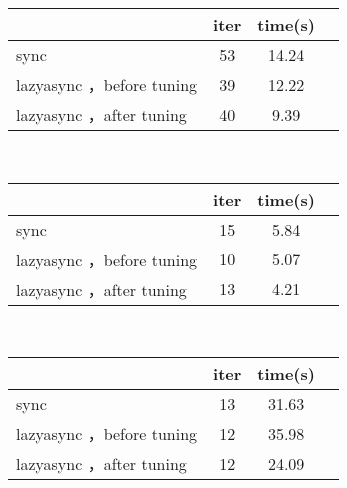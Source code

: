 \begin{table}[!htbp]
  \label{tab:tuning}
  \centering
  \footnotesize%
  \setlength{\tabcolsep}{4pt}%
  \renewcommand{\arraystretch}{1.2}%
  \begin{subtable}[t]{0.45\textwidth}
      \centering
      \label{tab:sample_1}
      \begin{tabular}{lccc}
          \hline
          & iter  & time(s) \\
          \hline
          sync & 53 & 14.24 \\
          \hline
          lazyasync ，before tuning & 39 & 12.22 \\
          \hline
          lazyasync ，after tuning & 40 & 9.39 \\
          \hline
      \end{tabular}
  \end{subtable}
  ~%
  \begin{subtable}[t]{0.45\textwidth}
      \centering
      \label{tab:sample_2}
      \begin{tabular}{lccc}
          \hline
          & iter & time(s) \\
          \hline
          sync & 15 & 5.84 \\
          \hline
          lazyasync ，before tuning & 10 & 5.07 \\
          \hline
          lazyasync ，after tuning & 13 & 4.21 \\
          \hline
      \end{tabular}
  \end{subtable}
  \\%
  \begin{subtable}[t]{0.45\textwidth}
      \centering
      \label{tab:sample_3}
      \begin{tabular}{lccc}
          \hline
          & iter  & time(s) \\
          \hline
          sync & 13& 31.63 \\
          \hline
          lazyasync ，before tuning & 12 & 35.98 \\
          \hline
          lazyasync ，after tuning & 12 & 24.09 \\
          \hline
      \end{tabular}

\end{subtable}
\end{table}
